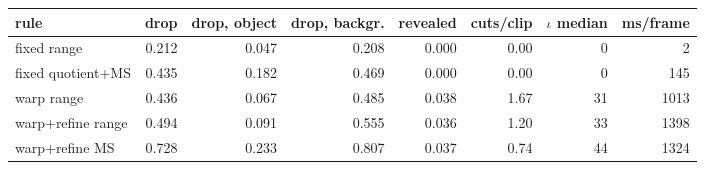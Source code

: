 \begin{tabular}{lrrrrrrr}
\toprule
rule & drop & drop, object & drop, backgr. & revealed & cuts/clip & $\iota$ median & ms/frame \\
\midrule
fixed range & 0.212 & 0.047 & 0.208 & 0.000 & 0.00 & 0 & 2 \\
fixed quotient+MS & 0.435 & 0.182 & 0.469 & 0.000 & 0.00 & 0 & 145 \\
warp range & 0.436 & 0.067 & 0.485 & 0.038 & 1.67 & 31 & 1013 \\
warp+refine range & 0.494 & 0.091 & 0.555 & 0.036 & 1.20 & 33 & 1398 \\
warp+refine MS & 0.728 & 0.233 & 0.807 & 0.037 & 0.74 & 44 & 1324 \\
\bottomrule
\end{tabular}
